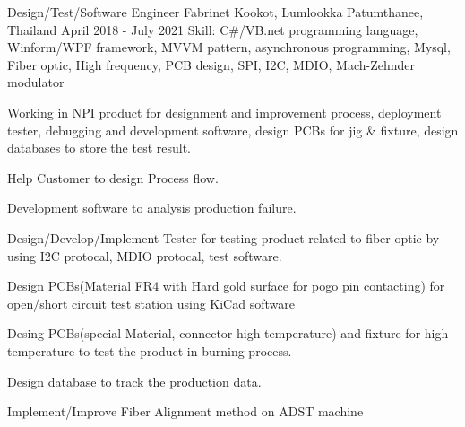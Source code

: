 \begin{cventries}
  \cventry
    {Design/Test/Software Engineer} %
    {Fabrinet} %
    {Kookot, Lumlookka Patumthanee, Thailand} %
    {April 2018 - July 2021} %
    {Skill: C\#/VB.net programming language, Winform/WPF framework, MVVM
    pattern, asynchronous programming, Mysql, Fiber optic, High frequency, PCB
    design, SPI, I2C, MDIO, Mach-Zehnder modulator} %
    {
      \begin{cvitems} %
        \item {Working in NPI product for designment and improvement
          process, deployment tester, debugging and development software, design
          PCBs for jig \& fixture, design databases to store the test result.}
        \item {Help Customer to design Process flow.}
        \item {Development software to analysis
          production failure.}
        \item {Design/Develop/Implement Tester for testing product related to
          fiber optic by using I2C protocal, MDIO protocal, test software.}
        \item {Design PCBs(Material FR4 with Hard gold surface for pogo pin
          contacting) for open/short circuit test station using KiCad software}
        \item {Desing PCBs(special Material, connector high temperature) and
          fixture for high temperature to test the product in burning
          process.}
        \item {Design database to track the production data.}
        \item {Implement/Improve Fiber Alignment method on ADST machine}
      \end{cvitems}
    }


\end{cventries}

